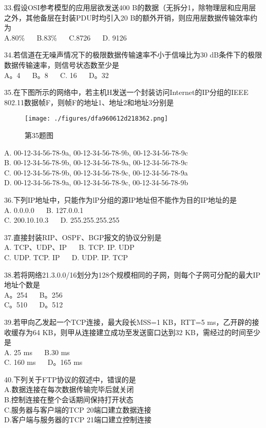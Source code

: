 33.假设OSI参考模型的应用层欲发送400 B的数据（无拆分1，除物理层和应用层之外，其他备层在封装PDU时均引入20 B的额外开销，则应用层数据传输效率约为 \\
A.80\%  $\quad$  B.83\%  $\quad$  C.8726 $\quad$ D. 9126

34.若信道在无噪声情况下的极限数据传输速率不小于信噪比为30 dB条件下的极限数据传输速率，则信号状态数至少是 \\
A。4 $\quad$  B。8 $\quad$ C. 16 $\quad$ D。32

35.在下图所示的网络中，若主机H发送一个封装访问Internet的IP分组的IEEE 802.11数据帧F，则帧F的地址1、地址2和地址3分别是 \\
\begin{figure}[ht]
\centering
\texttt{[image: ./figures/dfa960612d218362.png]}
\caption{第35题图} \label{fig_CSN17_3}
\end{figure}
A. 00-12-34-56-78-9a, 00-12-34-56-78-9b, 00-12-34-56-78-9c \\
B. 00-12-34-56-78-9b, 00-12-34-56-78-9a, 00-12-34-56-78-9c \\
C. 00-12-34-56-78-9b, 00-12-34-56-78-9c, 00-12-34-56-78-9a \\
D. 00-12-34-56-78-9a, 00-12-34-56-78-9c, 00-12-34-56-78-9b

36.下列IP地址中，只能作为lP分组的源IP地址但不能作为目的IP地址的是 \\
A. 0.0.0.0  $\quad$  B. 127.0.0.1 \\
C. 200.10.10.3  $\quad$  D. 255.255.255.255

37.直接封装RIP、OSPF、BGP报文的协议分别是 \\
A. TCP、UDP、IP  $\quad$  B. TCP. IP. UDP \\
C. UDP. TCP. IP  $\quad$  D. UDP. IP. TCP

38.若将网络21.3.0.0/16划分为128个规模相同的子网，则每个子网可分配的最大IP地址个数是 \\
A。254  $\quad$  B。256 \\
C。510  $\quad$  D。512

39.若甲向乙发起一个TCP连接，最大段长MSS=1 KB，RTT=5 ms，乙开辟的接收缓存为64 KB，则甲从连接建立成功至发送窗口达到32 KB，需经过的时间至少是 \\
A. 25 ms  $\quad$  B.30 ms  \\
C. 160 ms $\quad$  D。165 ms

40.下列关于FTP协议的叙述中，错误的是 \\
A.数据连接在每次数据传输完毕后就关闭 \\
B.控制连接在整个会话期间保持打开状态 \\
C.服务器与客户端的TCP 20端口建立数据连接 \\
D.客户端与服务器的TCP 21端口建立控制连接

